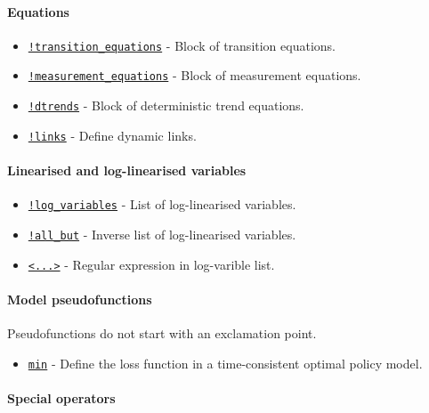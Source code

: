 \paragraph{Equations}

\begin{itemize}
\itemsep1pt\parskip0pt
\item
  \href{modellang/transitionequations}{\texttt{!transition\_equations}}
  - Block of transition equations.
\item
  \href{modellang/measurementequations}{\texttt{!measurement\_equations}}
  - Block of measurement equations.
\item
  \href{modellang/dtrends}{\texttt{!dtrends}} - Block of deterministic
  trend equations.
\item
  \href{modellang/links}{\texttt{!links}} - Define dynamic links.
\end{itemize}

\paragraph{Linearised and log-linearised
variables}

\begin{itemize}
\itemsep1pt\parskip0pt
\item
  \href{modellang/logvariables}{\texttt{!log\_variables}} - List of
  log-linearised variables.
\item
  \href{modellang/allbut}{\texttt{!all\_but}} - Inverse list of
  log-linearised variables.
\item
  \href{modellang/regexpression}{\texttt{\textless{}...\textgreater{}}}
  - Regular expression in log-varible list.
\end{itemize}

\paragraph{Model pseudofunctions}

Pseudofunctions do not start with an exclamation point.

\begin{itemize}
\itemsep1pt\parskip0pt
\item
  \href{modellang/min}{\texttt{min}} - Define the loss function in a
  time-consistent optimal policy model.
\end{itemize}

\paragraph{Special operators}

